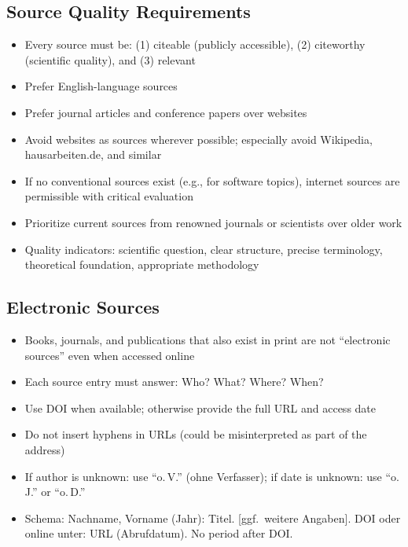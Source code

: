 \subsection{Source Quality Requirements}
\begin{itemize}
    \item Every source must be: (1) citeable (publicly accessible), (2) citeworthy (scientific quality), and (3) relevant
    \item Prefer English-language sources
    \item Prefer journal articles and conference papers over websites
    \item Avoid websites as sources wherever possible; especially avoid Wikipedia, hausarbeiten.de, and similar
    \item If no conventional sources exist (e.g., for software topics), internet sources are permissible with critical evaluation
    \item Prioritize current sources from renowned journals or scientists over older work
    \item Quality indicators: scientific question, clear structure, precise terminology, theoretical foundation, appropriate methodology
\end{itemize}

\subsection{Electronic Sources}
\begin{itemize}
    \item Books, journals, and publications that also exist in print are not ``electronic sources'' even when accessed online
    \item Each source entry must answer: Who? What? Where? When?
    \item Use DOI when available; otherwise provide the full URL and access date
    \item Do not insert hyphens in URLs (could be misinterpreted as part of the address)
    \item If author is unknown: use ``o.\,V.'' (ohne Verfasser); if date is unknown: use ``o.\,J.'' or ``o.\,D.''
    \item Schema: Nachname, Vorname (Jahr): Titel. [ggf.\ weitere Angaben]. DOI oder online unter: URL (Abrufdatum). No period after DOI.
\end{itemize}


